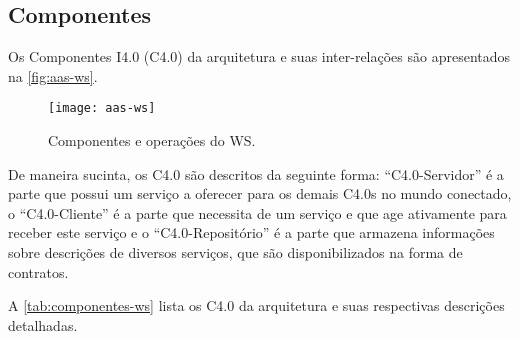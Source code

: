 \subsection{Componentes}

Os Componentes I4.0 (C4.0) da arquitetura e suas inter-relações são apresentados na \autoref{fig:aas-ws}.

\begin{figure}[htb]
	\centering
	\texttt{[image: aas-ws]}
	\caption{Componentes e operações do WS.}
	\label{fig:aas-ws}
\end{figure}

De maneira sucinta, os C4.0 são descritos da seguinte forma: ``C4.0-Servidor'' é a parte que possui um serviço a oferecer para os demais C4.0s no mundo conectado, o ``C4.0-Cliente'' é a parte que necessita de um serviço e que age ativamente para receber este serviço e o ``C4.0-Repositório'' é a parte que armazena informações sobre descrições de diversos serviços, que são disponibilizados na forma de contratos.

A \autoref{tab:componentes-ws} lista os C4.0 da arquitetura e suas respectivas descrições detalhadas.

